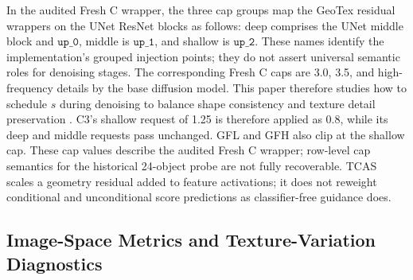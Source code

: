 \documentclass[times,twocolumn,final]{elsarticle}
\providecommand{\DIFadd}[1]{{\protect\color{blue} \sf #1}} %
\providecommand{\DIFdel}[1]{{\protect\color{red} \scriptsize #1}} %
\providecommand{\DIFaddbegin}{} %
\providecommand{\DIFaddend}{} %
\providecommand{\DIFdelbegin}{} %
\providecommand{\DIFdelend}{} %
\begin{document}
\DIFadd{In the audited Fresh C wrapper, the three cap groups map the GeoTex residual wrappers on the UNet ResNet blocks as follows: deep comprises the UNet middle block and $\texttt{up\_0}$, middle is $\texttt{up\_1}$, and shallow is $\texttt{up\_2}$. These names identify the implementation's grouped injection points; they do not assert universal semantic roles for denoising stages. The corresponding Fresh C caps are 3.0, 3.5, }\DIFaddend and \DIFdelbegin \DIFdel{high-frequency details by the base diffusion model. This paper therefore studies how to schedule $s$ during denoising to balance shape consistency and texture detail preservation}\DIFdelend \DIFaddbegin \DIFadd{0.8. C3's shallow request of 1.25 is therefore applied as 0.8, while its deep and middle requests pass unchanged. GFL and GFH also clip at the shallow cap. These cap values describe the audited Fresh C wrapper; row-level cap semantics for the historical 24-object probe are not fully recoverable. TCAS scales a geometry residual added to feature activations; it does not reweight conditional and unconditional score predictions as classifier-free guidance does}\DIFaddend .

\DIFdelbegin %
\DIFdelend \DIFaddbegin \subsection{Image-Space Metrics and Texture-Variation Diagnostics}
\DIFaddend \label{subsec:metrics}
\end{document}
